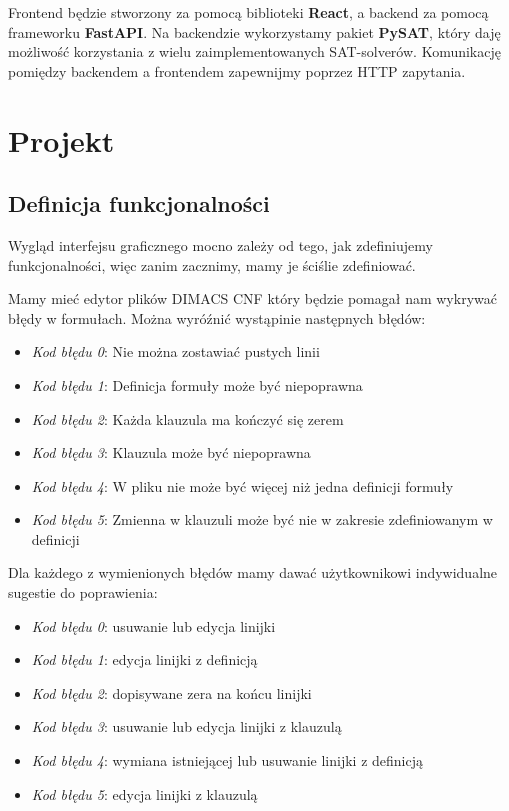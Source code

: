 \documentclass[a4paper,12pt,oneside]{book}
\theoremstyle{definition}
\begin{document}
Frontend będzie stworzony za pomocą biblioteki \textbf{React}, a backend za pomocą frameworku \textbf{FastAPI}. Na backendzie wykorzystamy pakiet \textbf{PySAT}, który daję możliwość korzystania z wielu zaimplementowanych SAT-solverów. Komunikację pomiędzy backendem a frontendem zapewnijmy poprzez HTTP zapytania.

\chapter{Projekt}

\section{Definicja funkcjonalności}

Wygląd interfejsu graficznego mocno zależy od tego, jak zdefiniujemy funkcjonalności, więc zanim zacznimy, mamy je ściślie zdefiniować.  

Mamy mieć edytor plików DIMACS CNF który będzie pomagał nam wykrywać błędy w formułach. Można wyróźnić wystąpinie następnych błędów:

\begin{itemize}
    \item \textit{Kod błędu 0}: Nie można zostawiać pustych linii
    \item \textit{Kod błędu 1}: Definicja formuły może być niepoprawna
    \item \textit{Kod błędu 2}: Każda klauzula ma kończyć się zerem
    \item \textit{Kod błędu 3}: Klauzula może być niepoprawna
    \item \textit{Kod błędu 4}: W pliku nie może być więcej niż jedna definicji formuły
    \item \textit{Kod błędu 5}: Zmienna w klauzuli może być nie w zakresie zdefiniowanym w definicji
\end{itemize}

\noindent Dla każdego z wymienionych błędów mamy dawać użytkownikowi indywidualne sugestie do poprawienia:

\begin{itemize}
    \item \textit{Kod błędu 0}: usuwanie lub edycja linijki
    \item \textit{Kod błędu 1}: edycja linijki z definicją
    \item \textit{Kod błędu 2}: dopisywane zera na końcu linijki
    \item \textit{Kod błędu 3}: usuwanie lub edycja linijki z klauzulą
    \item \textit{Kod błędu 4}: wymiana istniejącej lub usuwanie linijki z definicją
    \item \textit{Kod błędu 5}: edycja linijki z klauzulą
\end{itemize}
\end{document}
